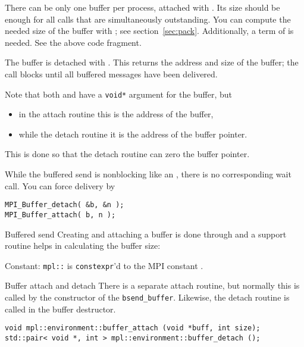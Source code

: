 There can be only one buffer per process, attached with
.
Its size should be enough
for all  calls that are simultaneously
outstanding.
You can compute the needed size of the buffer with ;
see section~\ref{sec:pack}.
Additionally, a term of  is needed.
See the above code fragment.

The buffer is detached with .
This returns the address and size of the buffer; the call blocks
until all buffered messages have been delivered.

Note that both
 and 
have a \lstinline+void*+ argument for the buffer, but 
\begin{itemize}
\item in the attach routine this is the address of the buffer,
\item while the detach routine it is the address of the buffer pointer.
\end{itemize}
This is done so that the detach routine can zero the buffer pointer.

While the buffered send is nonblocking like an ,
there is no corresponding wait call.
You can force delivery by
\begin{lstlisting}
MPI_Buffer_detach( &b, &n );
MPI_Buffer_attach( b, n );
\end{lstlisting}

\begin{mplnote}{Buffered send}
  Creating and attaching a buffer is done through 
  and a support routine  helps in calculating
  the buffer size:

  Constant: \lstinline+mpl::+ is \lstinline{constexpr}'d
  to the MPI constant .
\end{mplnote}

\begin{mplnote}{Buffer attach and detach}
  There is a separate attach routine, but normally this is called
  by the constructor of the \lstinline+bsend_buffer+.
  Likewise, the detach routine is called in the buffer destructor.
\begin{lstlisting}
void mpl::environment::buffer_attach (void *buff, int size);
std::pair< void *, int > mpl::environment::buffer_detach ();
\end{lstlisting}
\end{mplnote}

